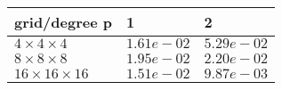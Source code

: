 \begin{tabular}{lll}
\hline
 grid/degree p            & 1          & 2          \\
\hline
 $4 \times 4 \times 4$    & $1.61e-02$ & $5.29e-02$ \\
 $8 \times 8 \times 8$    & $1.95e-02$ & $2.20e-02$ \\
 $16 \times 16 \times 16$ & $1.51e-02$ & $9.87e-03$ \\
\hline
\end{tabular}